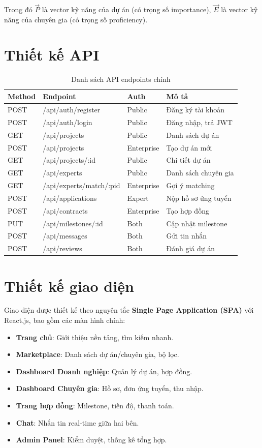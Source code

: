 Trong đó $\vec{P}$ là vector kỹ năng của dự án (có trọng số importance),
$\vec{E}$ là vector kỹ năng của chuyên gia (có trọng số proficiency).

\section{Thiết kế API}

\begin{table}[H]
\centering
\caption{Danh sách API endpoints chính}
\begin{tabular}{p{1.5cm} p{5.5cm} p{2.5cm} p{3cm}}
\toprule
\textbf{Method} & \textbf{Endpoint} & \textbf{Auth} & \textbf{Mô tả} \\
\midrule
POST & /api/auth/register        & Public  & Đăng ký tài khoản \\
POST & /api/auth/login           & Public  & Đăng nhập, trả JWT \\
GET  & /api/projects             & Public  & Danh sách dự án \\
POST & /api/projects             & Enterprise & Tạo dự án mới \\
GET  & /api/projects/:id         & Public  & Chi tiết dự án \\
GET  & /api/experts              & Public  & Danh sách chuyên gia \\
GET  & /api/experts/match/:pid   & Enterprise & Gợi ý matching \\
POST & /api/applications         & Expert  & Nộp hồ sơ ứng tuyển \\
POST & /api/contracts            & Enterprise & Tạo hợp đồng \\
PUT  & /api/milestones/:id       & Both    & Cập nhật milestone \\
POST & /api/messages             & Both    & Gửi tin nhắn \\
POST & /api/reviews              & Both    & Đánh giá dự án \\
\bottomrule
\end{tabular}
\end{table}

\section{Thiết kế giao diện}

Giao diện được thiết kế theo nguyên tắc \textbf{Single Page Application
(SPA)} với React.js, bao gồm các màn hình chính:

\begin{itemize}
  \item \textbf{Trang chủ}: Giới thiệu nền tảng, tìm kiếm nhanh.
  \item \textbf{Marketplace}: Danh sách dự án/chuyên gia, bộ lọc.
  \item \textbf{Dashboard Doanh nghiệp}: Quản lý dự án, hợp đồng.
  \item \textbf{Dashboard Chuyên gia}: Hồ sơ, đơn ứng tuyển, thu nhập.
  \item \textbf{Trang hợp đồng}: Milestone, tiến độ, thanh toán.
  \item \textbf{Chat}: Nhắn tin real-time giữa hai bên.
  \item \textbf{Admin Panel}: Kiểm duyệt, thống kê tổng hợp.
\end{itemize}
